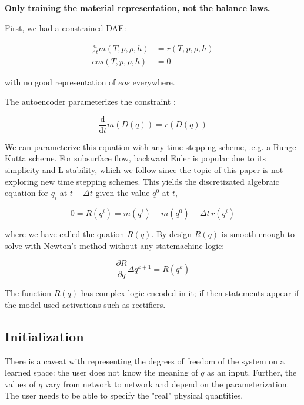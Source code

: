 \documentclass[]{article}
\begin{document}
\textbf{Only training the material representation, not the balance
laws.}

First, we had a constrained DAE:

\begin{align}
\frac{\mathrm{d}}{\mathrm{d}t} m(T,p,\rho,h) &= r(T,p,\rho,h)\\
eos(T,p,\rho,h) &= 0
\end{align}

with no good representation of \(eos\) everywhere.

The autoencoder parameterizes the constraint :

\begin{equation}
\frac{\mathrm{d}}{\mathrm{d}t} m(D(q)) = r(D(q))
\end{equation}

We can parameterize this equation with any time stepping scheme, .e.g. a
Runge-Kutta scheme. For subsurface flow, backward Euler is popular due
to its simplicity and L-stability, which we follow since the topic of
this paper is not exploring new time stepping schemes. This yields the
discretizated algebraic equation for \(q_i\) at \(t+\Delta t\) given the
value \(q^0\) at \(t\),

\begin{equation}
0 = R(q^i) = m(q^{i}) - m(q^{0}) - \Delta t \, r(q^i)
\end{equation}

where we have called the quation \(R(q)\). By design \(R(q)\) is smooth
enough to solve with Newton's method without any statemachine logic:

\begin{equation}
\frac{\partial R}{\partial q} \Delta q^{k+1} = R(q^k)
\end{equation}

The function \(R(q)\) has complex logic encoded in it; if-then
statements appear if the model used activations such as rectifiers.

\hypertarget{header-n3339}{%
\subsection{Initialization}\label{header-n3339}}

There is a caveat with representing the degrees of freedom of the system
on a learned space: the user does not know the meaning of \(q\) as an
input. Further, the values of \(q\) vary from network to network and
depend on the parameterization. The user needs to be able to specify the
"real" physical quantities.
\end{document}
